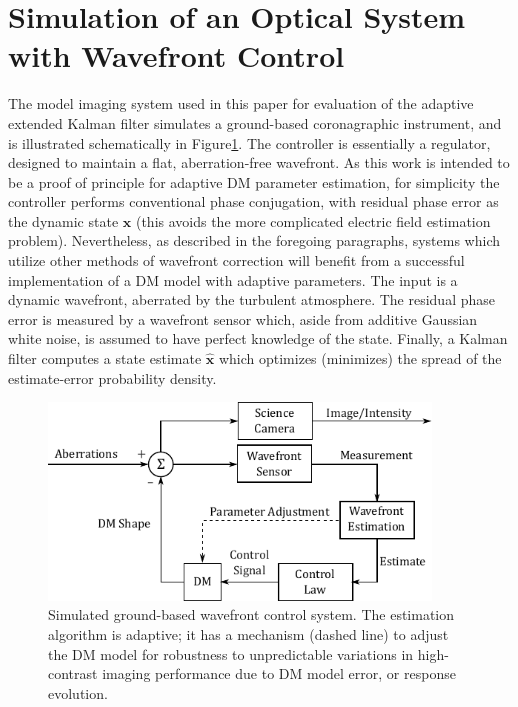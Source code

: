 \documentclass[11pt,reqno]{amsart}
\newcommand{\mbf}{\mathbf}
\begin{document}
\section{Simulation of an Optical System with Wavefront Control}\label{sec:system}

The model imaging system used in this paper for evaluation of the adaptive extended Kalman filter simulates a ground-based coronagraphic instrument, and is illustrated schematically in Figure\:\ref{fig:system}.  The controller is essentially a regulator, designed to maintain a flat, aberration-free wavefront.  As this work is intended to be a proof of principle for adaptive DM parameter estimation, for simplicity the controller performs conventional phase conjugation, with residual phase error as the dynamic state $\mbf{x}$ (this avoids the more complicated electric field estimation problem).  Nevertheless, as described in the foregoing paragraphs, systems which utilize other methods of wavefront correction will benefit from a successful implementation of a DM model with adaptive parameters.  The input is a dynamic wavefront, aberrated by the turbulent atmosphere.  The residual phase error is measured by a wavefront sensor which, aside from additive Gaussian white noise, is assumed to have perfect knowledge of the state.  Finally, a Kalman filter computes a state estimate $\hat{\mbf{x}}$ which optimizes (minimizes) the spread of the estimate-error probability density.

\begin{figure}[ht]
\centering
\includegraphics[width = 4in]{AEKF_DM.pdf}
\caption{Simulated ground-based wavefront control system.  The estimation algorithm is adaptive; it has a mechanism (dashed line) to adjust the DM model for robustness to unpredictable variations in high-contrast imaging performance due to DM model error, or response evolution.}
\label{fig:system}
\end{figure}
\end{document}

